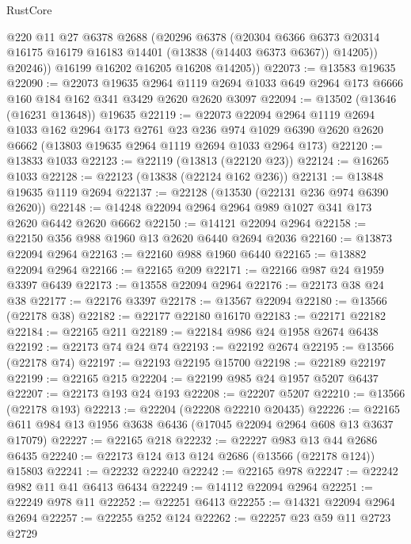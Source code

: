 \begin{lexlean}{RustCore}
\begin{coremodule}
            @220
            @11
            @27
            @6378
            @2688
            (@20296
              @6378
              (@20304
                @6366
                @6373
                @20314
                @16175
                @16179
                @16183
                @14401
                (@13838 (@14403 @6373 @6367))
                @14205))
            @20246))
        @16199
        @16202
        @16205
        @16208
        @14205))
@22073 := @13583 @19635
@22090 := @22073
    @19635
    @2964
    @1119
    @2694
    @1033
    @649
    @2964
    @173
    @6666
    @160
    @184
    @162
    @341
    @3429
    @2620
    @2620
    @3097
@22094 := @13502 (@13646 (@16231 @13648)) @19635
@22119 := @22073
    @22094
    @2964
    @1119
    @2694
    @1033
    @162
    @2964
    @173
    @2761
    @23
    @236
    @974
    @1029
    @6390
    @2620
    @2620
    @6662
    (@13803 @19635 @2964 @1119 @2694 @1033 @2964 @173)
@22120 := @13833 @1033
@22123 := @22119 (@13813 (@22120 @23))
@22124 := @16265 @1033
@22128 := @22123 (@13838 (@22124 @162 @236))
@22131 := @13848 @19635 @1119 @2694
@22137 := @22128 (@13530 (@22131 @236 @974 @6390 @2620))
@22148 := @14248 @22094 @2964 @2964 @989 @1027 @341 @173 @2620 @6442 @2620 @6662
@22150 := @14121 @22094 @2964
@22158 := @22150 @356 @988 @1960 @13 @2620 @6440 @2694 @2036
@22160 := @13873 @22094 @2964
@22163 := @22160 @988 @1960 @6440
@22165 := @13882 @22094 @2964
@22166 := @22165 @209
@22171 := @22166 @987 @24 @1959 @3397 @6439
@22173 := @13558 @22094 @2964
@22176 := @22173 @38 @24 @38
@22177 := @22176 @3397
@22178 := @13567 @22094
@22180 := @13566 (@22178 @38)
@22182 := @22177 @22180 @16170
@22183 := @22171 @22182
@22184 := @22165 @211
@22189 := @22184 @986 @24 @1958 @2674 @6438
@22192 := @22173 @74 @24 @74
@22193 := @22192 @2674
@22195 := @13566 (@22178 @74)
@22197 := @22193 @22195 @15700
@22198 := @22189 @22197
@22199 := @22165 @215
@22204 := @22199 @985 @24 @1957 @5207 @6437
@22207 := @22173 @193 @24 @193
@22208 := @22207 @5207
@22210 := @13566 (@22178 @193)
@22213 := @22204 (@22208 @22210 @20435)
@22226 := @22165 @611 @984 @13 @1956 @3638 @6436 (@17045 @22094 @2964 @608 @13 @3637 @17079)
@22227 := @22165 @218
@22232 := @22227 @983 @13 @44 @2686 @6435
@22240 := @22173 @124 @13 @124 @2686 (@13566 (@22178 @124)) @15803
@22241 := @22232 @22240
@22242 := @22165 @978
@22247 := @22242 @982 @11 @41 @6413 @6434
@22249 := @14112 @22094 @2964
@22251 := @22249 @978 @11
@22252 := @22251 @6413
@22255 := @14321 @22094 @2964 @2694
@22257 := @22255 @252 @124
@22262 := @22257 @23 @59 @11 @2723 @2729

\end{coremodule}
\end{lexlean}
